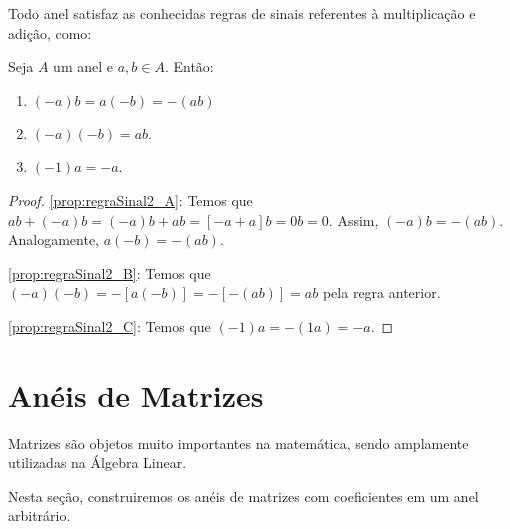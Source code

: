 Todo anel satisfaz as conhecidas regras de sinais referentes à multiplicação e adição, como:
\begin{prop}\label{prop:regraSinal2}
    Seja $A$ um anel e $a, b \in A$. Então:
    \begin{enumerate}[label=\alph*)]
        \item $(-a)b=a(-b)=-(ab)$\label{prop:regraSinal2_A}
        \item $(-a)(-b)=ab$.\label{prop:regraSinal2_B}
        \item $(-1)a=-a$.\label{prop:regraSinal2_C}
    \end{enumerate}
\end{prop}
\begin{proof}
    \ref{prop:regraSinal2_A}: Temos que $ab+(-a)b=(-a)b+ab=[-a+a]b=0b=0$. Assim, $(-a)b=-(ab)$. Analogamente, $a(-b)=-(ab)$.

    \ref{prop:regraSinal2_B}: Temos que $(-a)(-b)=-[a(-b)]=-[-(ab)]=ab$ pela regra anterior.

    \ref{prop:regraSinal2_C}: Temos que $(-1)a=-(1a)=-a$.
\end{proof}
\section{Anéis de Matrizes}
Matrizes são objetos muito importantes na matemática, sendo amplamente utilizadas na Álgebra Linear.

Nesta seção, construiremos os anéis de matrizes com coeficientes em um anel arbitrário.

